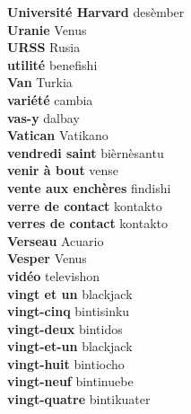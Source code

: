 \textbf{ Université Harvard  } desèmber \\
\textbf{ Uranie  } Venus \\
\textbf{ URSS  } Rusia \\
\textbf{ utilité  } benefishi \\
\textbf{ Van  } Turkia \\
\textbf{ variété  } cambia \\
\textbf{ vas-y  } dalbay \\
\textbf{ Vatican  } Vatikano \\
\textbf{ vendredi saint  } bièrnèsantu \\
\textbf{ venir à bout  } vense \\
\textbf{ vente aux enchères  } findishi \\
\textbf{ verre de contact  } kontakto \\
\textbf{ verres de contact  } kontakto \\
\textbf{ Verseau  } Acuario \\
\textbf{ Vesper  } Venus \\
\textbf{ vidéo  } televishon \\
\textbf{ vingt et un  } blackjack \\
\textbf{ vingt-cinq  } bintisinku \\
\textbf{ vingt-deux  } bintidos \\
\textbf{ vingt-et-un  } blackjack \\
\textbf{ vingt-huit  } bintiocho \\
\textbf{ vingt-neuf  } bintinuebe \\
\textbf{ vingt-quatre  } bintikuater \\
